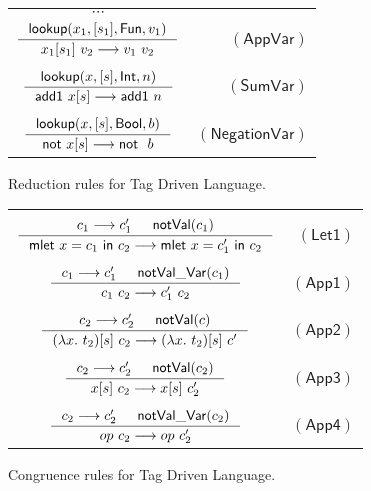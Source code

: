\documentclass[preprint,authoryear,sort&compress,9pt,nocopyrightspace]{article}
\newcommand\rulename[1]{\mathsf{(#1)}}
\newcommand{\tto}{\longrightarrow}
\newcommand{\conf}[2][s]{(#2)[#1]}
\newcommand{\oletP}[3]{\mathsf{mlet} \ x = #2 \ \mathsf{in}  \ #3}
\newcommand{\absST}[2]{\lambda #1. \ #2}
\newcommand{\negacion}[1]{\mathsf{not} \ #1}
\newcommand{\suma}[1]{\mathsf{add1} \ #1}
\newcommand{\boolt}{\mathsf{Bool}}
\newcommand{\intt}{\mathsf{Int}}
\newcommand{\funt}{\mathsf{Fun}}
\newcommand{\novalvar}[1]{\mathsf{notVal\_Var}(#1)}
\newcommand{\noval}[1]{\mathsf{notVal}(#1)}
\newcommand{\buscar}{\mathsf{lookup}}
\newcommand{\semanticB}{Tag Driven Language}
\begin{document}
\begin{figure}[h]
\begin{small}
\begin{center}
\begin{tabular}{|c r|}
\hline
$\cdots$&\\
$\inference{ \buscar(x_1, [s_1],\funt, v_1)}{x_1[s_1] \ v_2 \tto v_1 \ v_2}$&$\rulename{AppVar}$\\
&\\
$\inference{\buscar(x, [s], \intt, n)}{\suma{x[s]} \tto \suma{n}}$&$\rulename{SumVar}$\\
&\\
$\inference{\buscar(x, [s], \boolt, b)}{\negacion{x[s]} \tto \negacion \ b}$&$\rulename{NegationVar}$\\
\hline
\end{tabular}
\caption{Reduction rules for \semanticB.}
\label{tabla:reductionRules2}
\end{center}
\end{small}
\end{figure}

\begin{figure}[h]
\begin{small}
\begin{center}
\begin{tabular}{|c r|}
\hline
&\\
$ \inference {c_1 \tto c_1' & \noval{c_1}}{\oletP{T_1}{c_1}{c_2} \tto \oletP{T_1}{c_1'}{c_2} }$&$\rulename{Let1} $\\
&\\
$\inference {c_1 \tto c_1' & \novalvar{c_1}}{c_1 \ c_2 \tto c_1' \ c_2} $&$\rulename{App1}  $\\
&\\
$ \inference {c_2 \tto c_2' & \noval{c}}{\conf{\absST{x}{t_2}} \ c_2 \tto \conf{\absST{x}{t_2}} \ c'}$&$\rulename{App2}  $\\
&\\
$ \inference {c_2 \tto c_2' & \noval{c_2}}{x[s] \ c_2 \tto x[s] \ c_2'}$&$\rulename{App3}  $\\
&\\
$ \inference {c_2 \tto c_2' & \novalvar{c_2}}{op \ c_2 \tto op \ c_2'}$&$\rulename{App4}  $\\
\hline
\end{tabular}
\caption{Congruence rules for \semanticB.}
\label{tabla:congruenceRules2}
\end{center}
\end{small}
\end{figure}
\end{document}

